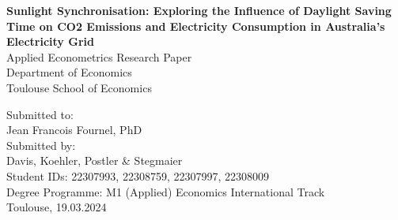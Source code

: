 \begin{titlepage}

\begin{center}

\vspace*{1,2cm}

\huge {\bfseries Sunlight Synchronisation: Exploring the Influence of Daylight Saving Time on CO2 Emissions and Electricity Consumption in Australia’s Electricity Grid}\\[1.8cm]

\Large {Applied Econometrics Research Paper}\\[1cm]

\large {Department of Economics}\\[0.2cm]

\large {Toulouse School of Economics}\\[0.5cm]

\end{center}

\vfill

\noindent Submitted to:\\
Jean Francois Fournel, PhD\\[0.7cm]
Submitted by:\\
Davis, Koehler, Postler \& Stegmaier\\[0.7cm]
Student IDs: 
22307993, %
22308759, %
22307997, %
22308009 %
\\
Degree Programme: M1 (Applied) Economics International Track \\[0.7cm]
Toulouse, 19.03.2024

\setcounter{page}{0}

\end{titlepage}